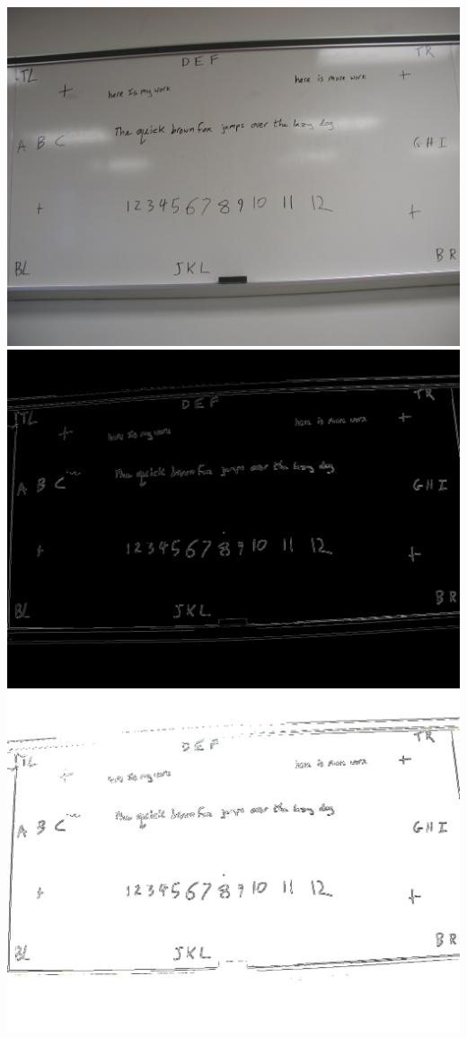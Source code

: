 \documentclass[]{article}
\begin{document}
		\includegraphics[scale=0.27]{images/cannyOriginal.jpg}
		\includegraphics[scale=0.2]{images/cannydemo.jpg} \\
		\includegraphics[scale=0.2]{images/cannydemo2.jpg}
\end{document}

